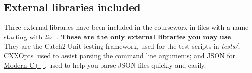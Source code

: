 \documentclass[a4paper]{article}
\begin{document}
\subsection*{External libraries included}
Three external libraries have been included in the coursework in files with a name starting with \emph{lib\_}. \textbf{These are the only external libraries you may use}. They are the \href{https://github.com/catchorg/Catch2}{Catch2 Unit testing framework}, used for the test scripts in \emph{tests/}; \href{https://github.com/jarro2783/cxxopts}{CXXOpts}, used to assist parsing the command line arguments; and \href{https://github.com/nlohmann/json}{JSON for Modern C++}, used to help you parse JSON files quickly and easily.




%
%
%
\end{document}
